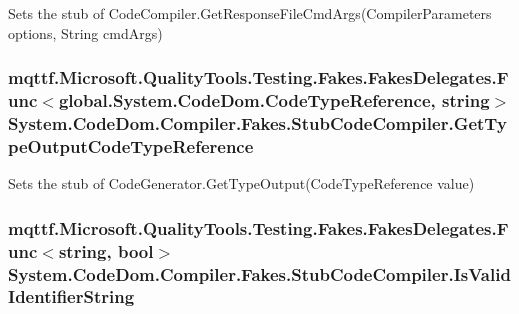 Sets the stub of Code\-Compiler.\-Get\-Response\-File\-Cmd\-Args(\-Compiler\-Parameters options, String cmd\-Args)

\hypertarget{class_system_1_1_code_dom_1_1_compiler_1_1_fakes_1_1_stub_code_compiler_a1948984e146ce99d12aa02b6eefa8428}{
\subsubsection[{Get\-Type\-Output\-Code\-Type\-Reference}]{\setlength{\rightskip}{0pt plus 5cm}mqttf.\-Microsoft.\-Quality\-Tools.\-Testing.\-Fakes.\-Fakes\-Delegates.\-Func$<$global.\-System.\-Code\-Dom.\-Code\-Type\-Reference, string$>$ System.\-Code\-Dom.\-Compiler.\-Fakes.\-Stub\-Code\-Compiler.\-Get\-Type\-Output\-Code\-Type\-Reference}}\label{class_system_1_1_code_dom_1_1_compiler_1_1_fakes_1_1_stub_code_compiler_a1948984e146ce99d12aa02b6eefa8428}


Sets the stub of Code\-Generator.\-Get\-Type\-Output(\-Code\-Type\-Reference value)

\hypertarget{class_system_1_1_code_dom_1_1_compiler_1_1_fakes_1_1_stub_code_compiler_a3170668c0bf31bb49f09beea0757a70f}{
\subsubsection[{Is\-Valid\-Identifier\-String}]{\setlength{\rightskip}{0pt plus 5cm}mqttf.\-Microsoft.\-Quality\-Tools.\-Testing.\-Fakes.\-Fakes\-Delegates.\-Func$<$string, bool$>$ System.\-Code\-Dom.\-Compiler.\-Fakes.\-Stub\-Code\-Compiler.\-Is\-Valid\-Identifier\-String}}\label{class_system_1_1_code_dom_1_1_compiler_1_1_fakes_1_1_stub_code_compiler_a3170668c0bf31bb49f09beea0757a70f}


